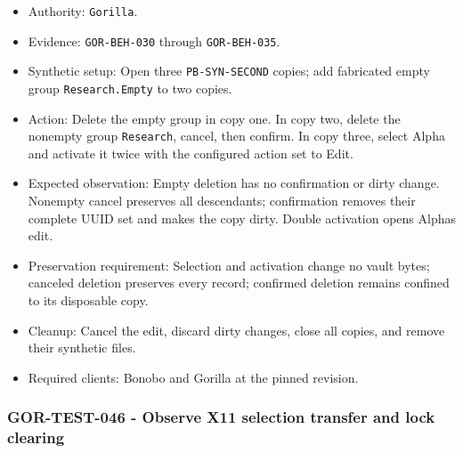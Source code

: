 \documentclass[
  letterpaper,
]{article}
\newcommand{\passthrough}[1]{#1}
\providecommand{\tightlist}{%
  \setlength{\itemsep}{0pt}\setlength{\parskip}{0pt}}
\begin{document}
\begin{itemize}
\tightlist
\item
  Authority: \passthrough{\lstinline!Gorilla!}.
\item
  Evidence: \nolinkurl{GOR-BEH-030} through \nolinkurl{GOR-BEH-035}.
\item
  Synthetic setup: Open three \nolinkurl{PB-SYN-SECOND} copies; add fabricated empty group \nolinkurl{Research.Empty} to
  two copies.
\item
  Action: Delete the empty group in copy one. In copy two, delete the nonempty group \passthrough{\lstinline!Research!},
  cancel, then confirm. In copy three, select Alpha and activate it twice with the configured action set to Edit.
\item
  Expected observation: Empty deletion has no confirmation or dirty change. Nonempty cancel preserves all descendants;
  confirmation removes their complete UUID set and makes the copy dirty. Double activation opens Alpha\textquotesingle s
  edit.
\item
  Preservation requirement: Selection and activation change no vault bytes; canceled deletion preserves every record;
  confirmed deletion remains confined to its disposable copy.
\item
  Cleanup: Cancel the edit, discard dirty changes, close all copies, and remove their synthetic files.
\item
  Required clients: Bonobo and Gorilla at the pinned revision.
\end{itemize}

\subsubsection{GOR-TEST-046 - Observe X11 selection transfer and lock
clearing}\label{gor-test-046---observe-x11-selection-transfer-and-lock-clearing}
\end{document}
